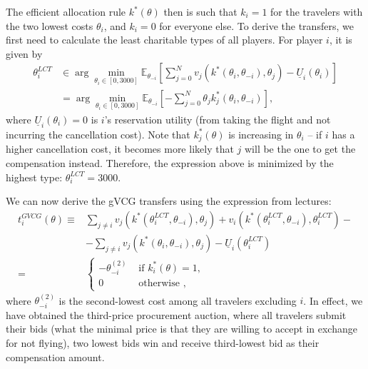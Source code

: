 \documentclass[a4paper]{article}
\begin{document}
\begin{enumerate}
	The efficient allocation rule $k^*(\theta)$ then is such that $k_i = 1$ for the travelers with the two lowest costs $\theta_i$, and $k_i=0$ for everyone else. To derive the transfers, we first need to calculate the least charitable types of all players. For player $i$, it is given by
	\begin{align*}
		\theta^{LCT}_i &\in \arg \min_{\theta_i \in [0,3000]} \mathbb{E}_{\theta_{-i}} \left[ \sum_{j=0}^{N} v_j (k^*(\theta_i,\theta_{-i}),\theta_j) - \underline{U}_i (\theta_i) \right]
		\\
		&= \arg \min_{\theta_i \in [0,3000]} \mathbb{E}_{\theta_{-i}} \left[ - \sum_{j=0}^N \theta_j k_j^*(\theta_i, \theta_{-i})  \right] ,
	\end{align*}
	where $\underline{U}_i (\theta_i) =0$ is $i$'s reservation utility (from taking the flight and not incurring the cancellation cost). Note that $k^*_j(\theta)$ is increasing in $\theta_i$ -- if $i$ has a higher cancellation cost, it becomes more likely that $j$ will be the one to get the compensation instead. Therefore, the expression above is minimized by the highest type: $\theta^{LCT}_i = 3000$.
	
	We can now derive the gVCG transfers using the expression from lectures:
	\begin{align*}
		t_i^{GVCG} (\theta) \equiv& \sum_{j \neq i} v_j (k^*(\theta^{LCT}_i,\theta_{-i}),\theta_j) + v_i (k^*(\theta^{LCT}_i,\theta_{-i}),\theta^{LCT}_i) -
		\\& - \sum_{j \neq i} v_j (k^*(\theta_i,\theta_{-i}),\theta_j) - \underline{U}_i (\theta^{LCT}_i)
		\\
		=& \begin{cases}
			- \theta_{-i}^{(2)} & \text{ if } k^*_i(\theta) = 1,
			\\
			0 & \text{ otherwise },
		\end{cases}
	\end{align*}
	where $\theta_{-i}^{(2)}$ is the second-lowest cost among all travelers excluding $i$. In effect, we have obtained the third-price procurement auction, where all travelers submit their bids (what the minimal price is that they are willing to accept in exchange for not flying), two lowest bids win and receive third-lowest bid as their compensation amount.
	

\end{enumerate}
\end{document}

